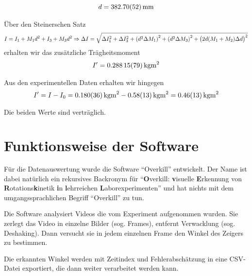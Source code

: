 \documentclass[a4paper,german,12pt,smallheadings]{scrartcl}
\begin{document}
\begin{equation}
  d = \SI{382.70\pm0.52}{mm}
\end{equation}

Über den Steinerschen Satz
\begin{equation}
  I = I_1 + M_1 d^2 + I_3 + M_3 d^2 \Rightarrow
  \Delta I = \sqrt{\Delta I_1^2 + \Delta I_3^2 + \del{d^2 \Delta M_1}^2 +
  \del{d^2 \Delta M_3}^2 + \del{2d (M_1+M_2) \Delta d}^2}
\end{equation}
erhalten wir das zusätzliche Trägheitsmoment
\begin{equation}
  I' = \SI{0.28815+-0.00079}{kg m^2}
\end{equation}

Aus den experimentellen Daten erhalten wir hingegen
\begin{equation}
  I' = I - I_0 = \SI{0.180+-0.036}{kg m^2} - \SI{0.58+-0.13}{kg m^2} = \SI{0.46+-0.13}{kg m^2}
\end{equation}

Die beiden Werte sind verträglich.

\section{Funktionsweise der Software}
\label{chap:software}
Für die Datenauswertung wurde die Software ``Overkill'' entwickelt. Der Name
ist dabei natürlich ein rekursives Backronym für ``\textbf{O}verkill:
\textbf{v}isuelle \textbf{E}rkennung von \textbf{R}otations\textbf{k}inetik
\textbf{i}n \textbf{l}ehrreichen \textbf{L}aborexperimenten'' und hat nichts mit dem
umgangssprachlichen Begriff ``Overkill'' zu tun.

Die Software analysiert Videos die vom Experiment aufgenommen wurden. Sie
zerlegt das Video in einzelne Bilder (sog. Frames), entfernt Verwacklung (sog.
Deshaking). Dann versucht sie in jedem einzelnen Frame den Winkel des Zeigers
zu bestimmen.

Die erkannten Winkel werden mit Zeitindex und Fehlerabschätzung in eine
CSV-Datei exportiert, die dann weiter verarbeitet werden kann.
\end{document}
